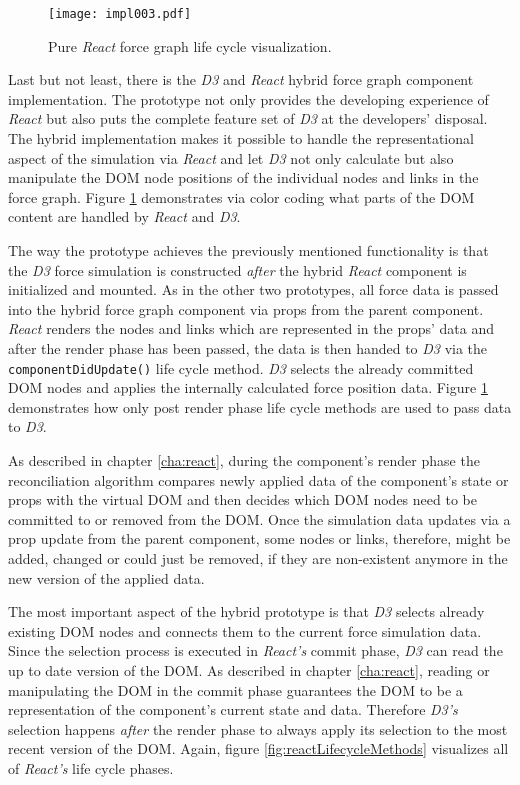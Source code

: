 \begin{figure}
\centering
\texttt{[image: impl003.pdf]}
\caption{Pure \emph{React} force graph life cycle visualization.}
\label{fig:reactD3HybridLifeCycle}
\end{figure}

Last but not least, there is the \emph{D3} and \emph{React} hybrid force graph component implementation. The prototype not only provides the developing experience of \emph{React} but also puts the complete feature set of \emph{D3} at the developers' disposal. The hybrid implementation makes it possible to handle the representational aspect of the simulation via \emph{React} and let \emph{D3} not only calculate but also manipulate the DOM node positions of the individual nodes and links in the force graph. Figure \ref{fig:reactD3HybridLifeCycle} demonstrates via color coding what parts of the DOM content are handled by \emph{React} and \emph{D3}. 

The way the prototype achieves the previously mentioned functionality is that the \emph{D3} force simulation is constructed \emph{after} the hybrid \emph{React} component is initialized and mounted. As in the other two prototypes, all force data is passed into the hybrid force graph component via props from the parent component. \emph{React} renders the nodes and links which are represented in the props' data and after the render phase has been passed, the data is then handed to \emph{D3} via the \texttt{componentDidUpdate()} life cycle method. \emph{D3} selects the already committed DOM nodes and applies the internally calculated force position data. Figure \ref{fig:reactD3HybridLifeCycle} demonstrates how only post render phase life cycle methods are used to pass data to \emph{D3}.

As described in chapter \ref{cha:react}, during the component's render phase the reconciliation algorithm compares newly applied data of the component's state or props with the virtual DOM and then decides which DOM nodes need to be committed to or removed from the DOM. Once the simulation data updates via a prop update from the parent component, some nodes or links, therefore, might be added, changed or could just be removed, if they are non-existent anymore in the new version of the applied data.

The most important aspect of the hybrid prototype is that \emph{D3} selects already existing DOM nodes and connects them to the current force simulation data. Since the selection process is executed in \emph{React's} commit phase, \emph{D3} can read the up to date version of the DOM. As described in chapter \ref{cha:react}, reading or manipulating the DOM in the commit phase guarantees the DOM to be a representation of the component's current state and data. Therefore \emph{D3's} selection happens \emph{after} the render phase to always apply its selection to the most recent version of the DOM. Again, figure \ref{fig:reactLifecycleMethods} visualizes all of \emph{React's} life cycle phases.

